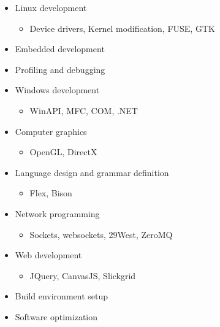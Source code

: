 \documentclass{report}
\begin{document}
\begin{table}[ht!]
\begin{tabular}
\begin{multicols}{2}
\begin{itemize}
                \item Linux development
                      \begin{itemize}
                          \item Device drivers, Kernel modification, FUSE, GTK
                      \end{itemize}
                \item Embedded development
                \item Profiling and debugging
                \item Windows development
                      \begin{itemize}
                          \item WinAPI, MFC, COM, .NET
                      \end{itemize}
                \item Computer graphics
                      \begin{itemize}
                          \item OpenGL, DirectX
                      \end{itemize}
                \item Language design and grammar definition
                      \begin{itemize}
                          \item Flex, Bison
                      \end{itemize}
                \item Network programming
                      \begin{itemize}
                          \item Sockets, websockets, 29West, ZeroMQ
                      \end{itemize}
                \item Web development
                      \begin{itemize}
                          \item JQuery, CanvasJS, Slickgrid
                      \end{itemize}
                \item Build environment setup
                \item Software optimization
            \end{itemize}
        \end{multicols} \\
    \end{tabular}
\end{table}
\end{document}
